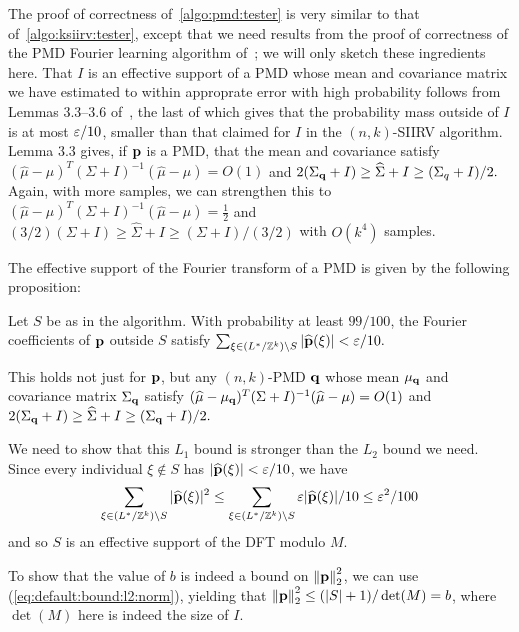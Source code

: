 The proof of correctness of~\cref{algo:pmd:tester} is very similar to that of~\cref{algo:ksiirv:tester}, except that we need results from the proof of correctness of the PMD Fourier learning algorithm of~\cite{DKS:15c}; we will only sketch these ingredients here. That $I$ is an effective support of a PMD whose mean and covariance matrix we have estimated to within approprate error with high probability follows from Lemmas 3.3--3.6 of~\cite{DKS:15c}, the last of which gives that the probability mass outside of $I$ is at most $\varepsilon/10$, smaller than that claimed for $I$ in the $(n,k)$-SIIRV algorithm. Lemma 3.3 gives, if $\mathbf{p}$ is a PMD, that the mean and covariance satisfy $(\widehat{\mu}-\mu)^T(\Sigma+I)^{-1}(\widehat{\mu}-\mu) = O(1)$ and $2(\Sigma_{\mathbf{q}}+I) \geq \widehat{\Sigma}+I \geq (\Sigma_q+I)/2.$ Again, with more samples, we can strengthen this to $(\widehat{\mu}-\mu)^T(\Sigma+I)^{-1}(\widehat{\mu}-\mu) = \frac{1}{2}$ and $(3/2)(\Sigma+I) \geq \widehat{\Sigma}+I \geq (\Sigma+I)/(3/2)$ with $O(k^4)$ samples.

\noindent The effective support of the Fourier transform of a PMD is given by the following proposition:
\begin{proposition} \label{prop:ft-effective-support}
Let $S$ be as in the algorithm. With probability at least $99/100$, the Fourier coefficients of $\mathbf{p}$ outside $S$ satisfy
$\sum_{\xi \in (L^{\ast}/\mathbb{Z}^k)  \setminus S }|\widehat{\mathbf{p}}(\xi)| < \varepsilon/10.$

This holds not just for $\mathbf{p}$, but any $(n,k)$-PMD $\mathbf{q}$ whose mean $\mu_{\mathbf{q}}$ and covariance matrix $\Sigma_{\mathbf{q}}$ satisfy $(\widehat{\mu}-\mu_{\mathbf{q}})^T(\Sigma+I)^{-1}(\widehat{\mu}-\mu) = O(1)$ and $2(\Sigma_{\mathbf{q}}+I) \geq \widehat{\Sigma}+I \geq (\Sigma_{\mathbf{q}}+I)/2.$
\end{proposition}

We need to show that this $L_1$ bound is stronger than the $L_2$ bound we need. Since every individual $\xi \notin S$ has $|\widehat{\mathbf{p}}(\xi)| < \varepsilon/10$, we have
$$\sum_{\xi \in (L^{\ast}/\mathbb{Z}^k)  \setminus S }|\widehat{\mathbf{p}}(\xi)|^2 \leq \sum_{\xi \in (L^{\ast}/\mathbb{Z}^k)  \setminus S } \varepsilon |\widehat{\mathbf{p}}(\xi)|/10 \leq \varepsilon^2/100$$
and so $S$ is an effective support of the DFT modulo $M$.


To show that the value of $b$ is indeed a bound on ${\lVert\mathbf{p}{\rVert}}_2^2$, we can use (\ref{eq:default:bound:l2:norm}), yielding that ${\lVert\mathbf{p}{\rVert}}_2^2 \leq (|S|+1)/\det(M) = b $, where $\det(M)$ here is indeed the size of $I$.

